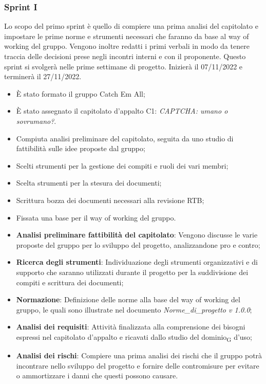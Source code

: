 \subsubsection{Sprint I}
Lo scopo del primo sprint è quello di compiere una prima analisi del capitolato e impostare le prime norme e strumenti necessari che faranno da base al way of working del gruppo. Vengono inoltre redatti i primi verbali in modo da tenere traccia delle decisioni prese negli incontri interni e con il proponente.
Questo sprint si svolgerà nelle prime settimane di progetto. Inizierà il 07/11/2022 e terminerà il 27/11/2022.

\:
\begin{itemize}
	\item È stato formato il gruppo Catch Em All;
	\item È stato assegnato il capitolato d’appalto C1: \textit{CAPTCHA: umano o sovrumano?}.
\end{itemize}

\:
\begin{itemize}
	\item Compiuta analisi preliminare del capitolato, seguita da uno studio di fattibilità sulle idee proposte dal gruppo;
	\item Scelti strumenti per la gestione dei compiti e ruoli dei vari membri;
	\item Scelta strumenti per la stesura dei documenti;
	\item Scrittura bozza dei documenti necessari alla revisione RTB;
	\item Fissata una base per il way of working del gruppo.
\end{itemize}

\:
\begin{itemize}
	\item \textbf{Analisi preliminare fattibilità del capitolato}: Vengono discusse le varie proposte del gruppo per lo sviluppo del progetto, analizzandone pro e contro;
	\item \textbf{Ricerca degli strumenti}: Individuazione degli strumenti organizzativi e di supporto che saranno utilizzati durante il progetto per la suddivisione dei compiti e scrittura dei documenti;
	\item \textbf{Normazione}: Definizione delle norme alla base del way of working del gruppo, le quali sono illustrate nel documento \textit{Norme\_di\_progetto v 1.0.0};
    \item \textbf{Analisi dei requisiti}: Attività finalizzata alla comprensione dei bisogni espressi nel capitolato d’appalto e ricavati dallo studio del dominio\textsubscript{G} d’uso;
    \item \textbf{Analisi dei rischi}: Compiere una prima analisi dei rischi che il gruppo potrà incontrare nello sviluppo del progetto e fornire delle contromisure per evitare o ammortizzare i danni che questi possono causare.
\end{itemize}

